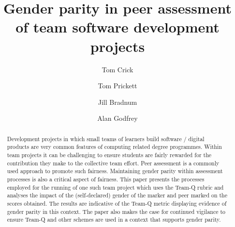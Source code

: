 \documentclass[sigconf, anonymous=true]{acmart}
\begin{document}
\title{Gender parity in peer assessment of team software development projects}

\author{Tom Crick}


\author{Tom Prickett}

\author{Jill Bradnum}

\author{Alan Godfrey}
\renewcommand{\shortauthors}{Crick and Prickett, et al.}

\begin{abstract}
 Development projects in which small teams of learners build software / digital products are very common features of computing related degree programmes. Within team projects it can be challenging to ensure students are fairly rewarded for the contribution they make to the collective team effort. Peer assessment is a commonly used approach to promote such fairness. Maintaining gender parity within assessment processes is also a critical aspect of fairness. This paper presents the processes employed for the running of one such team project which uses the Team-Q rubric and analyses the impact of the (self-declared) gender of the marker and peer marked on the scores obtained. The results are indicative of the Team-Q metric displaying evidence of gender parity in this context. The paper also makes the case for continued vigilance to ensure Team-Q and other schemes are used in a context that supports gender parity. 
\end{abstract}
\end{document}
